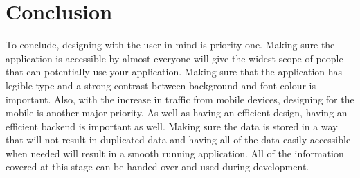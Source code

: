 \section{Conclusion}
To conclude, designing with the user in mind is priority one. Making sure the application is accessible by almost everyone will give the widest scope of people that can potentially use your application. Making sure that the application has legible type and a strong contrast between background and font colour is important. Also, with the increase in traffic from mobile devices, designing for the mobile is another major priority. As well as having an efficient design, having an efficient backend is important as well. Making sure the data is stored in a way that will not result in duplicated data and having all of the data easily accessible when needed will result in a smooth running application. All of the information covered at this stage can be handed over and used during development.